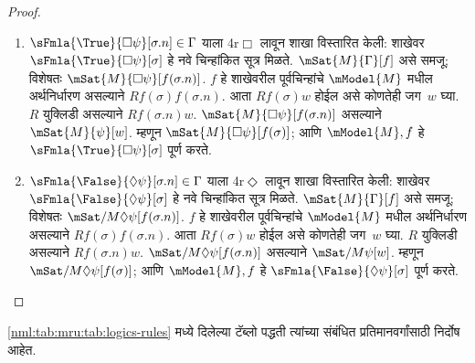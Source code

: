 \begin{proof}
\begin{enumerate}
\item $\sFmla{\True}{\Box \psi}[\sigma.n] \in \Gamma$
  याला 4r$\Box$ लावून शाखा विस्तारित केली:
  शाखेवर
    $\sFmla{\True}{\Box\psi}[\sigma]$ हे नवे
    चिन्हांकित सूत्र मिळते. $\mSat{M}{\Gamma}[f]$
    असे समजू; विशेषतः $\mSat{M}{\Box
      \psi}[f(\sigma.n)]$.
    $f$ हे शाखेवरील पूर्वचिन्हांचे
    $\mModel{M}$ मधील अर्थनिर्धारण असल्याने
    $Rf(\sigma)f(\sigma.n)$.
    आता $Rf(\sigma)w$ होईल असे कोणतेही
    जग~$w$ घ्या. $R$ युक्लिडी असल्याने
    $Rf(\sigma.n)w$.
    $\mSat{M}{\Box \psi}[f(\sigma.n)]$
    असल्याने $\mSat{M}{\psi}[w]$.
    म्हणून $\mSat{M}{\Box \psi}[f(\sigma)]$;
    आणि $\mModel{M}, f$ हे
    $\sFmla{\True}{\Box \psi}[\sigma]$ पूर्ण करते.
\item $\sFmla{\False}{\Diamond \psi}[\sigma.n] \in \Gamma$
  याला 4r$\Diamond$ लावून शाखा विस्तारित केली:
  शाखेवर
    $\sFmla{\False}{\Diamond\psi}[\sigma]$ हे नवे
    चिन्हांकित सूत्र मिळते. $\mSat{M}{\Gamma}[f]$
    असे समजू; विशेषतः $\mSat/{M}{\Diamond
      \psi}[f(\sigma.n)]$.
    $f$ हे शाखेवरील पूर्वचिन्हांचे
    $\mModel{M}$ मधील अर्थनिर्धारण असल्याने
    $Rf(\sigma)f(\sigma.n)$.
    आता $Rf(\sigma)w$ होईल असे कोणतेही
    जग~$w$ घ्या. $R$ युक्लिडी असल्याने
    $Rf(\sigma.n)w$.
    $\mSat/{M}{\Diamond \psi}[f(\sigma.n)]$
    असल्याने $\mSat/{M}{\psi}[w]$.
    म्हणून $\mSat/{M}{\Diamond \psi}[f(\sigma)]$;
    आणि $\mModel{M}, f$ हे
    $\sFmla{\False}{\Diamond \psi}[\sigma]$ पूर्ण करते.
\end{enumerate}
\end{proof}
\begin{cor}
\label{nml:tab:msn:cor:soundness-logics}
\ref{nml:tab:mru:tab:logics-rules} मध्ये दिलेल्या
टॅब्लो पद्धती त्यांच्या संबंधित
प्रतिमानवर्गांसाठी निर्दोष आहेत.
\end{cor}
